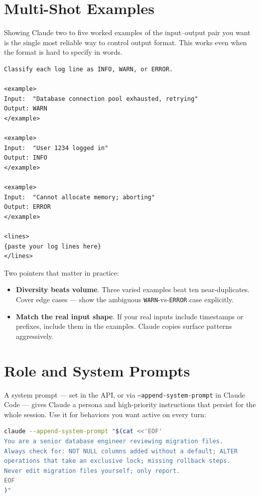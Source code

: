 \section{Multi-Shot Examples}
\label{sec:multishot}


Showing Claude two to five worked examples of the input--output pair you
want is the single most reliable way to control output format. This works
even when the format is hard to specify in words.

\begin{lstlisting}[caption={Multi-shot prompt for log line classification}]
Classify each log line as INFO, WARN, or ERROR.

<example>
Input:  "Database connection pool exhausted, retrying"
Output: WARN
</example>

<example>
Input:  "User 1234 logged in"
Output: INFO
</example>

<example>
Input:  "Cannot allocate memory; aborting"
Output: ERROR
</example>

<lines>
{paste your log lines here}
</lines>
\end{lstlisting}

Two pointers that matter in practice:

\begin{itemize}
  \item \textbf{Diversity beats volume}. Three varied examples beat ten
        near-duplicates. Cover edge cases — show the ambiguous
        \texttt{WARN}-vs-\texttt{ERROR} case explicitly.
  \item \textbf{Match the real input shape}. If your real inputs include
        timestamps or prefixes, include them in the examples. Claude
        copies surface patterns aggressively.
\end{itemize}

\section{Role and System Prompts}
\label{sec:roles}


A system prompt — set in the API, or via \texttt{--append-system-prompt}
in Claude Code — gives Claude a persona and high-priority instructions
that persist for the whole session. Use it for behaviors you want active
on every turn:

\begin{lstlisting}[language=bash,caption={Appending a system prompt to a Claude Code session}]
claude --append-system-prompt "$(cat <<'EOF'
You are a senior database engineer reviewing migration files.
Always check for: NOT NULL columns added without a default; ALTER
operations that take an exclusive lock; missing rollback steps.
Never edit migration files yourself; only report.
EOF
)"
\end{lstlisting}

